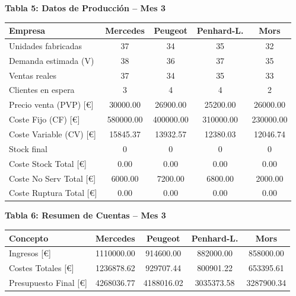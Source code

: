 \documentclass{standalone}
\begin{document}
	\leavevmode
	
	\begin{minipage}{1.08\linewidth}
		\centering
		
		\textbf{Tabla 5: Datos de Producción – Mes 3}\\[0.5em]
		\begin{tabular}{@{}l
				S[table-format=2.0]
				S[table-format=2.0]
				S[table-format=2.0]
				S[table-format=2.0]@{}}
			\toprule
			\textbf{Empresa} & \textbf{Mercedes} & \textbf{Peugeot} & \textbf{Penhard-L.} & \textbf{Mors} \\
			\midrule
			Unidades fabricadas         & 37        & 34        & 35        & 32        \\
			Demanda estimada (V)        & 38        & 36        & 37        & 35        \\
			Ventas reales               & 37        & 34        & 35        & 33        \\
			Clientes en espera          & 3         & 4         & 4         & 2         \\
			Precio venta (PVP) [\euro]  & 30000.00  & 26900.00  & 25200.00  & 26000.00  \\
			Coste Fijo (CF) [\euro]     & 580000.00 & 400000.00 & 310000.00 & 230000.00 \\
			Coste Variable (CV) [\euro] & 15845.37  & 13932.57  & 12380.03  & 12046.74  \\
			Stock final                 & 0         & 0         & 0         & 0         \\
			Coste Stock Total [\euro]   & 0.00      & 0.00      & 0.00      & 0.00      \\
			Coste No Serv Total [\euro] & 6000.00   & 7200.00   & 6800.00   & 2000.00   \\
			Coste Ruptura Total [\euro] & 0.00      & 0.00      & 0.00      & 0.00      \\
			\bottomrule
		\end{tabular}
		
		\vspace{2em}
		
		\textbf{Tabla 6: Resumen de Cuentas – Mes 3}\\[0.5em]
		\begin{tabular}{@{}l
				S[table-format=7.2]
				S[table-format=7.2]
				S[table-format=7.2]
				S[table-format=7.2]@{}}
			\toprule
			\textbf{Concepto} & \textbf{Mercedes} & \textbf{Peugeot} & \textbf{Penhard-L.} & \textbf{Mors} \\
			\midrule
			Ingresos [\euro]              & 1110000.00 & 914600.00  & 882000.00  & 858000.00  \\
			Costes Totales [\euro]        & 1236878.62 & 929707.44  & 800901.22  & 653395.61  \\
			Presupuesto Final [\euro]     & 4268036.77 & 4188016.02 & 3035373.58 & 3287900.34 \\
			\bottomrule
		\end{tabular}
		
	\end{minipage}
\end{document}
